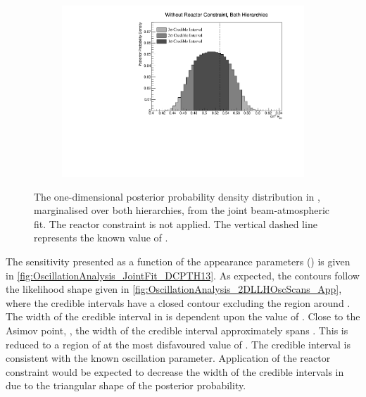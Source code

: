 \begin{figure}[h]
  \begin{subfigure}[t]{0.98\textwidth}
    \includegraphics[width=\textwidth, trim={0mm 0mm 0mm 0mm}, clip,page=1]{Figures/OA/JointFit/Contours_1D_th23_BH_1_woRC_UnSmeared_CredibleInterval.pdf}
  \end{subfigure}
  \caption{The one-dimensional posterior probability density distribution in , marginalised over both hierarchies, from the joint beam-atmospheric fit. The reactor constraint is not applied. The vertical dashed line represents the known value of .}
  \label{fig:OscillationAnalysis_JointFit_TH23}
\end{figure}

The sensitivity presented as a function of the appearance parameters () is given in \autoref{fig:OscillationAnalysis_JointFit_DCPTH13}. As expected, the contours follow the likelihood shape given in \autoref{fig:OscillationAnalysis_2DLLHOscScans_App}, where the \quickmath{2\sigma} credible intervals have a closed contour excluding the region around . The width of the \quickmath{3\sigma} credible interval in  is dependent upon the value of . Close to the Asimov point, , the width of the \quickmath{3\sigma} credible interval approximately spans . This is reduced to a region of  at the most disfavoured value of .
The \quickmath{1\sigma} credible interval is consistent with the known oscillation parameter. Application of the reactor constraint would be expected to decrease the width of the \quickmath{1\sigma} credible intervals in  due to the triangular shape of the posterior probability. 

